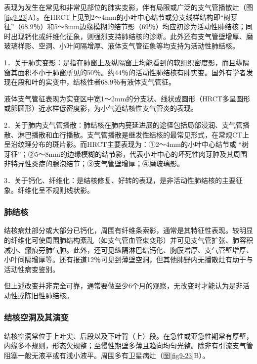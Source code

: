 表现为发生在常见和非常见部位的肺实变影，伴有局限或广泛的支气管播散灶（图\ref{fig9-23}A）。在HRCT上见到2～4mm的小叶中心结节或分支线样结构即“树芽征”（68.9％）和5～8mm边缘模糊的结节影（69％）均应初诊为活动性肺结核；同时出现钙化或纤维化征象，则强烈支持肺结核的诊断。此外还有支气管壁增厚、磨玻璃样影、空洞、小叶间隔增厚、液体支气管征象等均支持为活动性肺结核。

1．关于肺实变影：是指在肺窗上及纵隔窗上均能看到的软组织密度影，而且纵隔窗其面积不小于肺窗所见的50％。约44％的活动性肺结核有肺实变。国外有学者发现在段和叶的实变中，结核性者68.9％有液体支气管征。

液体支气管征表现为实变区中宽1～2mm的分支状、线状或圆形（HRCT多呈圆形或卵圆形）近水样低密度影，为小气道结核性支气管炎的表现。

2．关于肺内支气管播散：肺结核在肺内蔓延进展的途径包括局部浸润、支气管播散、淋巴播散和血行播散。支气管播散是继发性结核的最常见形式，在常规CT上呈沿纹理分布的斑片影。而HRCT主要表现为：①2～4mm的小叶中心结节或
“树芽征”；②5～8mm的边缘模糊的结节影，代表小叶中心的坏死性肉芽肿及其周围非特异性炎症的腺泡结节；③支气管壁增厚；④磨玻璃影。

3．关于钙化、纤维化：是结核修复、好转的表现，是非活动性肺结核的主要征象。纤维化呈不规则线状影。

\subsubsection{肺结核}

结核病灶部分或大部分已钙化，周围有纤维条索影，通常是其特征性表现。较明显的纤维化可使周围肺结构紊乱（如支气管血管束变形）并可见支气管扩张、肺容积减小、瘢痕旁肺气肿。此外，还可见纵隔淋巴结钙化、胸膜增厚、支气管壁增厚、小叶间隔增厚等。还有报道12％可见到薄壁空洞，但其他肺野内无播散灶有助于与活动性病变鉴别。

但上述改变并非完全可靠，通常要做至少6个月的观察，无改变时才能认为是非活动性或陈旧性肺结核。

\subsubsection{结核空洞及其演变}

结核空洞常位于上叶尖、后段以及下叶背（上）段。在急性或亚急性期常有厚壁，内缘多不规则，形态欠规整；至慢性期壁多薄且趋向均匀光整。除非有引流支气管阻塞一般无液平或有浅小液平。周围多有卫星病灶（图\ref{fig9-23}B）。

